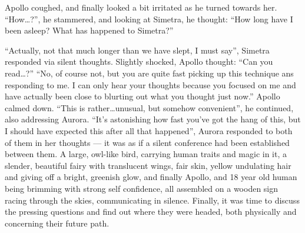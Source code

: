 Apollo coughed, and finally looked a bit irritated as he turned towards her. \enquote{How\dots?}, he stammered, and looking at Simetra, he thought: \enquote{How long have I been asleep? What has happened to Simetra?}

\enquote{Actually, not that much longer than we have slept, I must say}, Simetra responded via silent thoughts. Slightly shocked, Apollo thought: \enquote{Can you read\dots?} \enquote{No, of course not, but you are quite fast picking up this technique ans responding to me. I can only hear your thoughts because you focused on me and have actually been close to blurting out what you thought just now.}
Apollo calmed down. \enquote{This is rather\dots unusual, but somehow convenient}, he continued, also addressing Aurora. \enquote{It's astonishing how fast you've got the hang of this, but I should have expected this after all that happened}, Aurora responded to both of them in her thoughts --- it was as if a silent conference had been established between them. A large, owl-like bird, carrying human traits and magic in it, a slender, beautiful fairy with translucent wings, fair skin, yellow undulating hair and giving off a bright, greenish glow, and finally Apollo, and 18 year old human being brimming with strong self confidence, all assembled on a wooden sign racing through the skies, communicating in silence. Finally, it was time to discuss the pressing questions and find out where they were headed, both physically and concerning their future path.

